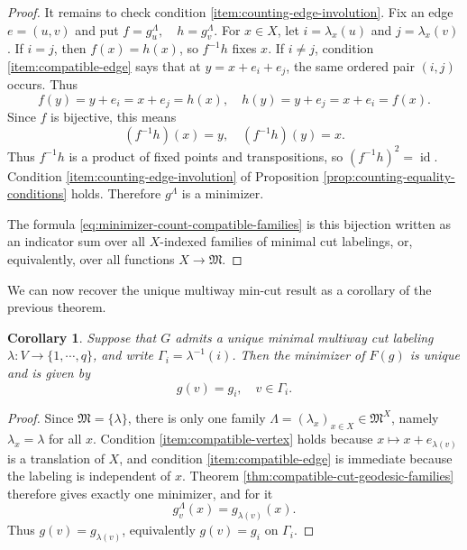 \documentclass[11pt,oneside,letterpaper]{article}
\numberwithin{equation}{section}
\newtheorem{corollary}[theorem]{Corollary}
\theoremstyle{definition}
\theoremstyle{remark}
\DeclareMathOperator{\id}{id}
\begin{document}
\begin{proof}
  It remains to check condition \ref{item:counting-edge-involution}.
  Fix an edge $e=(u,v)$ and put $f=g_u^\Lambda,\quad h=g_v^\Lambda$. For $x\in X$, let $i=\lambda_x(u)$ and $j=\lambda_x(v)$.  If $i=j$,
  then $f(x)=h(x)$, so $f^{-1}h$ fixes $x$.  If $i\ne j$, condition
  \ref{item:compatible-edge} says that at $y=x+e_i+e_j$, the same ordered pair $(i,j)$ occurs. Thus
  \begin{equation}
    f(y)=y+e_i=x+e_j=h(x),\quad
    h(y)=y+e_j=x+e_i=f(x).
  \end{equation}
  Since $f$ is bijective, this means
  \begin{equation}
    (f^{-1}h)(x)=y,\quad (f^{-1}h)(y)=x.
  \end{equation}
  Thus $f^{-1}h$ is a product of fixed points and transpositions, so
  $(f^{-1}h)^2=\id$.  Condition
  \ref{item:counting-edge-involution} of Proposition
  \ref{prop:counting-equality-conditions} holds. Therefore
  $g^\Lambda$ is a minimizer.

  The formula \eqref{eq:minimizer-count-compatible-families} is this
  bijection written as an indicator sum over all $X$-indexed families of
  minimal cut labelings, or, equivalently, over all functions $X \to \mathfrak M$.
\end{proof}

We can now recover the unique multiway min-cut result as a corollary of
the previous theorem.
\begin{corollary}
  \label{cor:unique-mincut-from-characterization}
  Suppose that $G$ admits a unique minimal multiway cut labeling
  $\lambda:V\to\{1,\cdots,q\}$, and write
  $\Gamma_i=\lambda^{-1}(i)$.  Then the minimizer of $F(g)$ is unique
  and is given by
  \begin{equation}
    g(v)=g_i,\quad v\in\Gamma_i.
  \end{equation}
\end{corollary}
\begin{proof}
  Since $\mathfrak{M}=\{\lambda\}$, there is only one family
  $\Lambda=(\lambda_x)_{x\in X}\in\mathfrak{M}^X$, namely
  $\lambda_x=\lambda$ for all $x$.  Condition
  \ref{item:compatible-vertex} holds because
  $x\mapsto x+e_{\lambda(v)}$ is a translation of $X$, and condition
  \ref{item:compatible-edge} is immediate because the labeling is
  independent of $x$.  Theorem
  \ref{thm:compatible-cut-geodesic-families} therefore gives exactly one
  minimizer, and for it
  \begin{equation}
    g_v^\Lambda(x)=g_{\lambda(v)}(x).
  \end{equation}
  Thus $g(v)=g_{\lambda(v)}$, equivalently $g(v)=g_i$ on
  $\Gamma_i$.
\end{proof}
\end{document}
